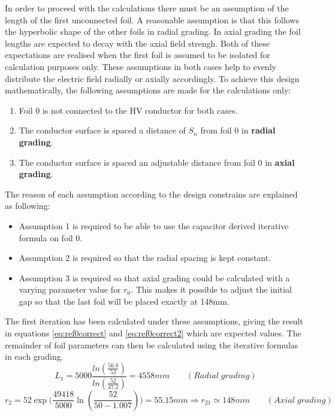 In order to proceed with the calculations there must be an assumption of the length of the first unconnected foil.
A reasonable assumption is that this follows the hyperbolic shape of the other foils in radial grading. In axial grading the foil lengths are expected to decay with the axial field strengh.
Both of these expectations are realised when the first foil is assumed to be isolated for calculation purposes only. These assumptions in both cases help to evenly distribute the electric field radially or axially accordingly.
To achieve this design mathematically, the following assumptions are made for the calculations only:
\begin{enumerate}
\item Foil $0$ is not connected to the HV conductor for both cases.
\item The conductor surface is spaced a distance of $S_n$ from foil $0$ in \textbf{radial grading}.
\item The conductor surface is spaced an adjustable distance from foil $0$ in \textbf{axial grading}.
\end{enumerate}
The reason of each assumption  according to the design constrains are explained as following:
\begin{itemize}[topsep=0pt] \itemsep=0.5em
\item Assumption 1 is required to be able to use the capacitor derived iterative formula on foil 0.
\item Assumption 2 is required so that the radial spacing is kept constant. 
\item Assumption 3 is required so that axial grading could be calculated with a varying parameter value for $r_0$. This makes it possible to adjust the initial gap so that the last foil will be placed exactly at 148mm. 

\end{itemize}
The first iteration has been calculated under these assumptions, giving the result in equations \ref{eq:ref0correct} and \ref{eq:ref0correct2} which are expected values.
The remainder of foil parameters can then be calculated using the iterative formulas in each grading.
\begin{equation}
   \label{eq:ref0correct}
   L_{1}
   = 5000\displaystyle\frac{{ln(\displaystyle\frac{56.8}{52})} }{ln(\displaystyle\frac{52}{47.2})}
   = 4558mm \qquad (Radial \; grading)
\end{equation}
\begin{equation}
\label{eq:ref0correct2}
   r_2 = 52 \exp\big( \frac{49418}{5000} \ln(\frac{52}{50-1.007})\big)= 55.15mm \Longrightarrow r_{21}\simeq 148mm \qquad (Axial \; grading)
\end{equation}


